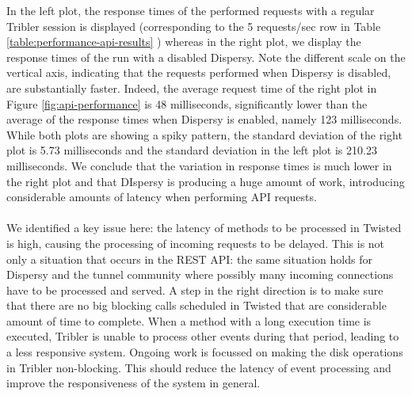 In the left plot, the response times of the performed requests with a regular Tribler session is displayed (corresponding to the 5 requests/sec row in Table \ref{table:performance-api-results} ) whereas in the right plot, we display the response times of the run with a disabled Dispersy. Note the different scale on the vertical axis, indicating that the requests performed when Dispersy is disabled, are substantially faster. Indeed, the average request time of the right plot in Figure \ref{fig:api-performance} is 48 milliseconds, significantly lower than the average of the response times when Dispersy is enabled, namely 123 milliseconds. While both plots are showing a spiky pattern, the standard deviation of the right plot is 5.73 milliseconds and the standard deviation in the left plot is 210.23 milliseconds. We conclude that the variation in response times is much lower in the right plot and that DIspersy is producing a huge amount of work, introducing considerable amounts of latency when performing API requests.\\\\
We identified a key issue here: the latency of methods to be processed in Twisted is high, causing the processing of incoming requests to be delayed. This is not only a situation that occurs in the REST API: the same situation holds for Dispersy and the tunnel community where possibly many incoming connections have to be processed and served. A step in the right direction is to make sure that there are no big blocking calls scheduled in Twisted that are considerable amount of time to complete. When a method with a long execution time is executed, Tribler is unable to process other events during that period, leading to a less responsive system. Ongoing work is focussed on making the disk operations in Tribler non-blocking. This should reduce the latency of event processing and improve the responsiveness of the system in general.\\\\
